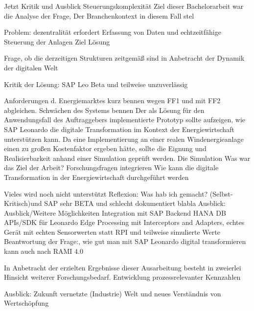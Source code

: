 Jetzt Kritik 
und Ausblick
Steuerungskomplexität 
Ziel dieser Bachelorarbeit war die Analyse der Frage,  Der Branchenkontext in diesem Fall stel

Problem: dezentralität erfordert Erfassung von Daten und echtzeitfähige Steuerung der Anlagen 
Ziel
Lösung

Frage, ob die derzeitigen Strukturen zeitgemäß sind in Anbetracht der Dynamik der digitalen Welt

Kritik der Lösung: SAP Leo Beta und teilweise unzuverlässig

Anforderungen d. Energiemarktes kurz bennen wegen FF1 und mit FF2 abgleichen. Schwächen des Systems bennen 
Der als Lösung für den Anwendungsfall des Auftraggebers implementierte Prototyp sollte aufzeigen, wie SAP Leonardo die digitale Transformation im Kontext der Energiewirtschaft unterstützen kann. Da eine Implementierung an einer realen Windenergieanlage einen zu großen Kostenfaktor ergeben hätte, sollte die Eignung und Realisierbarkeit anhand einer Simulation geprüft werden. Die Simulation 
Was war das Ziel der Arbeit? Forschungsfragen integrieren
Wie kann die digitale Transformation in der Energiewirtschaft durchgeführt werden

Vieles wird noch nicht unterstützt
Reflexion:
Was hab ich gemacht? (Selbst-Kritisch)und SAP sehr BETA und schlecht dokumentiert blabla
\newline
Ausblick:
Ausblick/Weitere Möglichkeiten
Integration mit SAP Backend
HANA DB
APIs/SDK für Leonardo
Edge Processing mit Interceptors and Adapters, echtes Gerät mit echten Sensorwerten statt RPI und teilweise simulierte Werte
\newline
Beantwortung der Frage:, wie gut man mit SAP Leonardo digital transformieren kann auch nach RAMI 4.0


In Anbetracht der erzielten Ergebnisse dieser Ausarbeitung besteht in zweierlei Hinsicht weiterer Forschungsbedarf. 
Entwicklung prozessrelevanter Kennzahlen

Ausblick: Zukunft vernetzte (Industrie) Welt und neues Verständnis von Wertschöpfung
\newpage
